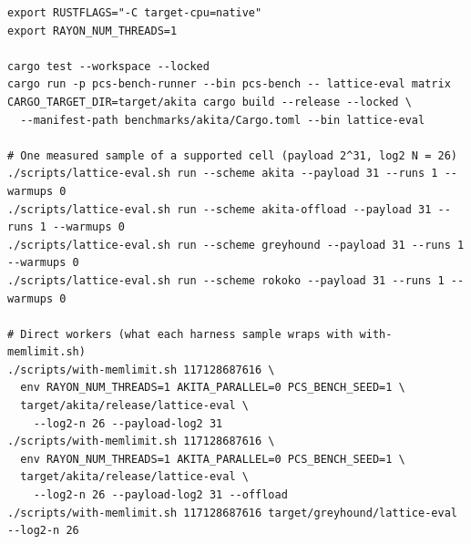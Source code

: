 \begin{verbatim}
export RUSTFLAGS="-C target-cpu=native"
export RAYON_NUM_THREADS=1

cargo test --workspace --locked
cargo run -p pcs-bench-runner --bin pcs-bench -- lattice-eval matrix
CARGO_TARGET_DIR=target/akita cargo build --release --locked \
  --manifest-path benchmarks/akita/Cargo.toml --bin lattice-eval

# One measured sample of a supported cell (payload 2^31, log2 N = 26)
./scripts/lattice-eval.sh run --scheme akita --payload 31 --runs 1 --warmups 0
./scripts/lattice-eval.sh run --scheme akita-offload --payload 31 --runs 1 --warmups 0
./scripts/lattice-eval.sh run --scheme greyhound --payload 31 --runs 1 --warmups 0
./scripts/lattice-eval.sh run --scheme rokoko --payload 31 --runs 1 --warmups 0

# Direct workers (what each harness sample wraps with with-memlimit.sh)
./scripts/with-memlimit.sh 117128687616 \
  env RAYON_NUM_THREADS=1 AKITA_PARALLEL=0 PCS_BENCH_SEED=1 \
  target/akita/release/lattice-eval \
    --log2-n 26 --payload-log2 31
./scripts/with-memlimit.sh 117128687616 \
  env RAYON_NUM_THREADS=1 AKITA_PARALLEL=0 PCS_BENCH_SEED=1 \
  target/akita/release/lattice-eval \
    --log2-n 26 --payload-log2 31 --offload
./scripts/with-memlimit.sh 117128687616 target/greyhound/lattice-eval --log2-n 26
\end{verbatim}
